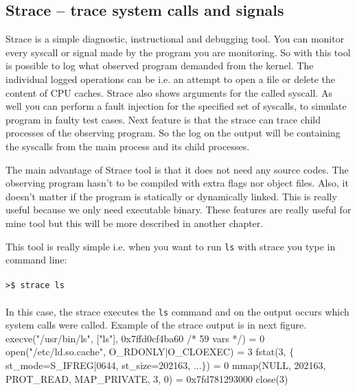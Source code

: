 \subsection{Strace -- trace system calls and signals}

Strace\cite{strace_man} is a simple diagnostic, instructional and debugging tool.
You can monitor every syscall or signal made by the program you are monitoring.
So with this tool is possible to log what observed program demanded from the kernel.
The individual logged operations can be i.e. an attempt to open a file or delete the content of CPU caches.
Strace also shows arguments for the called syscall.
As well you can perform a fault injection for the specified set of syscalls, to simulate program in faulty test cases.
Next feature is that the strace can trace child processes of the observing program.
So the log on the output will be containing the syscalls from the main process and its child processes.

The main advantage of Strace tool is that it does not need any source codes.
The observing program hasn't to be compiled with extra flags nor object files.
Also, it doesn't matter if the program is statically or dynamically linked.
This is really useful because we only need executable binary.
These features are really useful for mine tool but this will be more described in another chapter.

This tool is really simple i.e. when you want to run \texttt{ls} with strace you type in command line:\\
\\
\texttt{>\$ strace ls}\\
\\
In this case, the strace executes the \texttt{ls} command and on the output occurs which system calls were called.
Example of the strace output is in next figure.\\[2mm]

\selectfont\noindent
execve("/usr/bin/ls", ["ls"], 0x7ffd0cf4ba60 /* 59 vars */) = 0\linebreak
open("/etc/ld.so.cache", O\_RDONLY|O\_CLOEXEC) = 3\linebreak
fstat(3, $\{$ st\_mode=S\_IFREG|0644, st\_size=202163, ...$\}$) = 0\linebreak
mmap(NULL, 202163, PROT\_READ, MAP\_PRIVATE, 3, 0) = 0x7fd781293000\linebreak
close(3)\linebreak
\fontfamily{\familydefault}\selectfont

